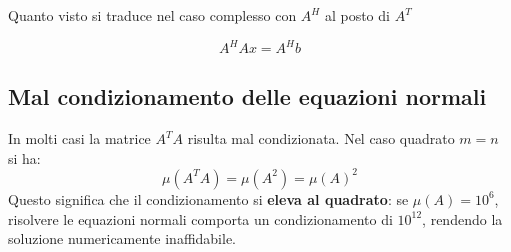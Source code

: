 \documentclass[12pt,a4paper,]{report}
\begin{document}
\begin{nota}
    Quanto visto si traduce nel caso complesso con $A^H$ al posto di $A^T$
\end{nota}

\begin{lezione}
    [Lezione 12 12/04]
\end{lezione}

\begin{definizione}
    \[
    A^HAx=A^Hb
    \]
\end{definizione}
\subsection{Mal condizionamento delle equazioni normali}
In molti casi la matrice $A^TA$ risulta mal condizionata. Nel caso quadrato $m = n$ si ha:
\[
\mu(A^TA) = \mu(A^2) = \mu(A)^2
\]
Questo significa che il condizionamento si \textbf{eleva al quadrato}: se $\mu(A) = 10^6$, risolvere le equazioni normali comporta un condizionamento di $10^{12}$, rendendo la soluzione numericamente inaffidabile.
\end{document}
